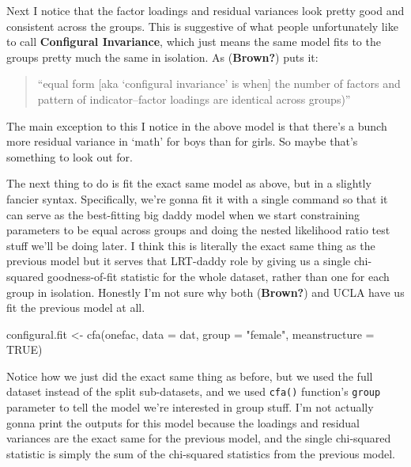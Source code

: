 \documentclass[
  letterpaper,
  DIV=11,
  numbers=noendperiod]{scrreprt}
\newenvironment{Shaded}{\begin{snugshade}}{\end{snugshade}}
\newcommand{\AttributeTok}[1]{\textcolor[rgb]{0.40,0.45,0.13}{#1}}
\newcommand{\ConstantTok}[1]{\textcolor[rgb]{0.56,0.35,0.01}{#1}}
\newcommand{\FunctionTok}[1]{\textcolor[rgb]{0.28,0.35,0.67}{#1}}
\newcommand{\NormalTok}[1]{\textcolor[rgb]{0.00,0.23,0.31}{#1}}
\newcommand{\OtherTok}[1]{\textcolor[rgb]{0.00,0.23,0.31}{#1}}
\newcommand{\StringTok}[1]{\textcolor[rgb]{0.13,0.47,0.30}{#1}}
\begin{document}
Next I notice that the factor loadings and residual variances look
pretty good and consistent across the groups. This is suggestive of what
people unfortunately like to call \textbf{Configural Invariance}, which
just means the same model fits to the groups pretty much the same in
isolation. As (\textbf{Brown?}) puts it:

\begin{quote}
``equal form {[}aka `configural invariance' is when{]} the number of
factors and pattern of indicator--factor loadings are identical across
groups)''
\end{quote}

The main exception to this I notice in the above model is that there's a
bunch more residual variance in `math' for boys than for girls. So maybe
that's something to look out for.

The next thing to do is fit the exact same model as above, but in a
slightly fancier syntax. Specifically, we're gonna fit it with a single
command so that it can serve as the best-fitting big daddy model when we
start constraining parameters to be equal across groups and doing the
nested likelihood ratio test stuff we'll be doing later. I think this is
literally the exact same thing as the previous model but it serves that
LRT-daddy role by giving us a single chi-squared goodness-of-fit
statistic for the whole dataset, rather than one for each group in
isolation. Honestly I'm not sure why both (\textbf{Brown?}) and UCLA
have us fit the previous model at all.

\begin{Shaded}
\begin{Highlighting}[]
\NormalTok{configural.fit }\OtherTok{\textless{}{-}} \FunctionTok{cfa}\NormalTok{(onefac, }\AttributeTok{data =}\NormalTok{ dat, }\AttributeTok{group =} \StringTok{"female"}\NormalTok{, }\AttributeTok{meanstructure =} \ConstantTok{TRUE}\NormalTok{)}
\end{Highlighting}
\end{Shaded}

Notice how we just did the exact same thing as before, but we used the
full dataset instead of the split sub-datasets, and we used
\texttt{cfa()} function's \texttt{group} parameter to tell the model
we're interested in group stuff. I'm not actually gonna print the
outputs for this model because the loadings and residual variances are
the exact same for the previous model, and the single chi-squared
statistic is simply the sum of the chi-squared statistics from the
previous model.
\end{document}

